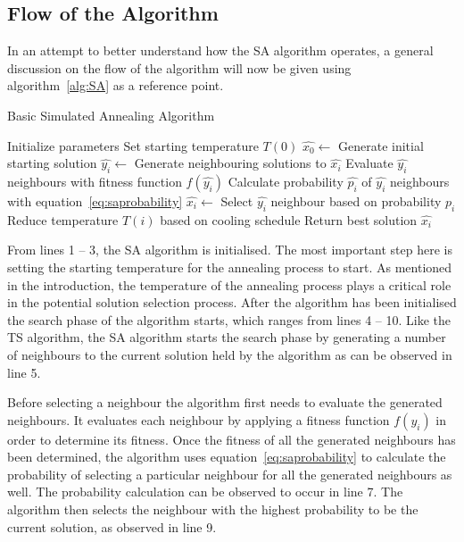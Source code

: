\subsection{Flow of the Algorithm}
In an attempt to better understand how the \gls{SA} algorithm operates, a general discussion on the flow of the algorithm will now be given using algorithm~\ref{alg:SA} as a reference point.
\begin{algorithm}[H]
\caption{Basic Simulated Annealing Algorithm\cite{VeryFastSAImageEnchancement,ChaosSA}}
\label{alg:SA}
	\begin{algorithmic}[1]
		\State Initialize parameters
		\State Set starting temperature $T(0)$
    \State $\hat{x_0} \leftarrow$ Generate initial starting solution
    \State $\hat{y_i} \leftarrow$ Generate neighbouring solutions to $\hat{x_i}$
    \State Evaluate $\hat{y_i}$ neighbours with fitness function $f(\hat{y_i})$
    \State Calculate probability $\hat{p_i}$ of $\hat{y_i}$ neighbours with equation~\ref{eq:saprobability}
    \State $\hat{x_i} \leftarrow$ Select $\hat{y_i}$ neighbour based on probability $p_i$
			\State Reduce temperature $T(i)$ based on cooling schedule
		\EndWhile
    \State Return best solution $\hat{x_i}$
	\end{algorithmic}
\end{algorithm}

From lines 1 -- 3, the \gls{SA} algorithm is initialised. The most important step here is setting the starting temperature for the annealing process to start. As mentioned in the introduction, the temperature of the annealing process plays a critical role in the potential solution selection process. After the algorithm has been initialised the search phase of the algorithm starts, which ranges from lines 4 -- 10. Like the \gls{TS} algorithm, the \gls{SA} algorithm starts the search phase by generating a number of neighbours to the current solution held by the algorithm as can be observed in line 5.

Before selecting a neighbour the algorithm first needs to evaluate the generated neighbours. It evaluates each neighbour by applying a fitness function $f(y_i)$ in order to determine its fitness.
Once the fitness of all the generated neighbours has been determined, the algorithm uses equation~\ref{eq:saprobability} to calculate the probability of selecting a particular neighbour for all the generated neighbours as well. The probability calculation can be observed to occur in line 7. The algorithm then selects the neighbour with the highest probability to be the current solution, as observed in line 9. 

